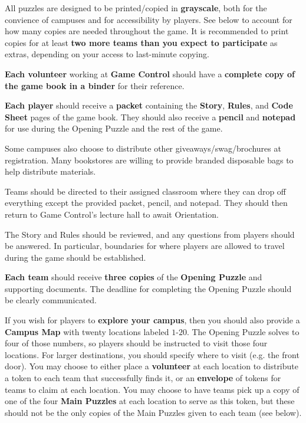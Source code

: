 
All puzzles are designed to be printed/copied in \textbf{grayscale}, both
for the convience of campuses and for accessibility by players.
See below to account for how many copies are needed throughout the game.
It is recommended to print copies for at least
\textbf{two more teams than you expect to participate} as extras, depending
on your access to last-minute copying.

\textbf{Each volunteer} working at \textbf{Game Control} should have a
\textbf{complete copy of the game book in a binder} for their reference.


\textbf{Each player} should receive a \textbf{packet} containing the
\textbf{Story}, \textbf{Rules}, and \textbf{Code Sheet} pages of the game book.
They should also receive
a \textbf{pencil} and \textbf{notepad} for use during the Opening Puzzle
and the rest of the game.

Some campuses also choose to distribute other giveaways/swag/brochures
at registration. Many bookstores are willing to provide branded disposable
bags to help distribute materials.

Teams should be directed to their assigned classroom where they can
drop off everything except the provided packet, pencil, and notepad.
They should then return to Game Control's lecture hall to await Orientation.


The Story and Rules should be reviewed, and any questions from players
should be answered. In particular, boundaries for where players are allowed
to travel during the game should be established.


\textbf{Each team} should receive \textbf{three copies} of the
\textbf{Opening Puzzle} and supporting documents. The deadline for
completing the Opening Puzzle should be clearly communicated.

If you wish for players to \textbf{explore your campus}, then you should
also provide a \textbf{Campus Map} with twenty locations labeled \(1\)-\(20\).
The Opening Puzzle solves to four of those numbers, so players should be
instructed to visit those four locations. For larger destinations, you should
specify where to visit (e.g. the front door). You may choose to either place
a \textbf{volunteer} at each location to distribute a token to each team that
successfully finds it, or an \textbf{envelope} of tokens for teams to claim at
each location. You may choose to have teams pick up a copy of one of the four
\textbf{Main Puzzles} at each location to serve as this token, but these should
not be the only copies of the Main Puzzles given to each team (see below).

